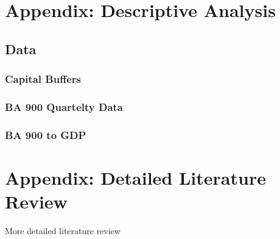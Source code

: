 \documentclass[
]{article}
\begin{document}
\hypertarget{appendix-descriptive-analysis}{%
\section{Appendix: Descriptive Analysis}\label{appendix-descriptive-analysis}}

\hypertarget{data}{%
\subsection{Data}\label{data}}

\hypertarget{capital-buffers}{%
\subsubsection{Capital Buffers}\label{capital-buffers}}

\hypertarget{ba-900-quartelty-data}{%
\subsubsection{BA 900 Quartelty Data}\label{ba-900-quartelty-data}}

\hypertarget{ba-900-to-gdp}{%
\subsubsection{BA 900 to GDP}\label{ba-900-to-gdp}}

\newpage

\hypertarget{appendix-detailed-literature-review}{%
\section{Appendix: Detailed Literature Review}\label{appendix-detailed-literature-review}}

More detailed literature review

\newpage

\renewcommand\refname{References}
  
\end{document}
